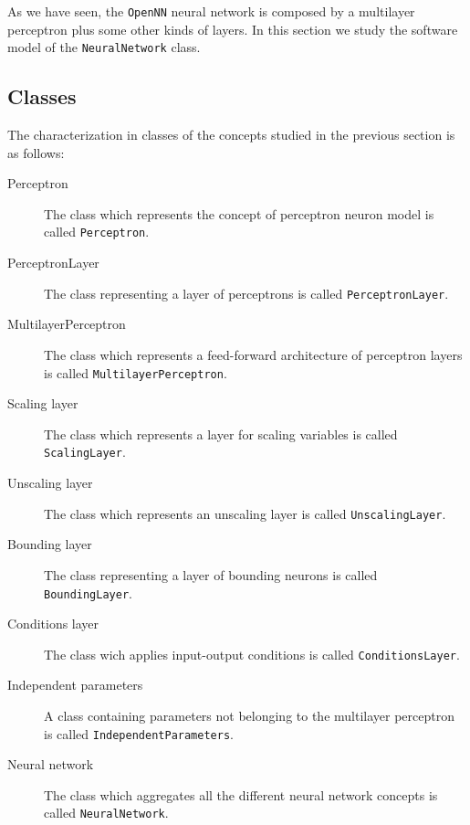 
As we have seen, the \texttt{OpenNN} neural network is composed by a multilayer perceptron plus some other kinds of layers. 
In this section we study the software model of the \lstinline"NeuralNetwork" class. 


\subsection*{Classes}

The characterization in classes of the concepts studied in the previous section is as follows:

\begin{description}

\item[Perceptron] The class which represents the concept of perceptron neuron model is called \lstinline"Perceptron".

\item[PerceptronLayer] The class representing a layer of perceptrons is called \lstinline"PerceptronLayer".

\item[MultilayerPerceptron] The class which represents a feed-forward architecture of perceptron layers is called \lstinline"MultilayerPerceptron".

\item[Scaling layer] The class which represents a layer for scaling variables is called \lstinline"ScalingLayer".

\item[Unscaling layer] The class which represents an unscaling layer is called \lstinline"UnscalingLayer".
 
\item[Bounding layer] The class representing a layer of bounding neurons is called \lstinline"BoundingLayer".

\item[Conditions layer] The class wich applies input-output conditions is called \lstinline"ConditionsLayer".

\item[Independent parameters] A class containing parameters not belonging to the multilayer perceptron is called \lstinline"IndependentParameters".

\item[Neural network] The class which aggregates all the different neural network concepts is called \lstinline"NeuralNetwork".

\end{description}

